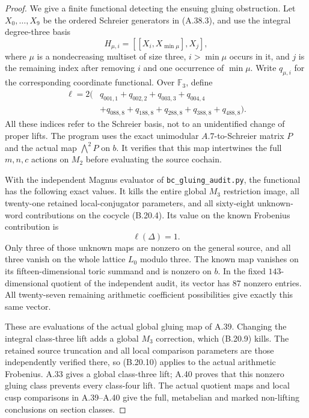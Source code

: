 \begin{proof}
We give a finite functional detecting the ensuing
gluing obstruction. Let $X_0,\ldots,X_9$ be the
ordered Schreier generators in (A.38.3), and use
the integral degree-three basis
\[
 H_{\mu,i}=[[X_i,X_{\min\mu}],X_j],
\]
where $\mu$ is a nondecreasing multiset of size
three, $i>\min\mu$ occurs in it, and $j$ is the
remaining index after removing $i$ and one
occurrence of $\min\mu$. Write $q_{\mu,i}$ for
the corresponding coordinate functional.
Over $\mathbb F_3$, define
\[
 \begin{split}
 \ell=2\bigl(&q_{001,1}+q_{002,2}+q_{003,3}+q_{004,4}\\
             &+q_{088,8}+q_{188,8}+q_{288,8}
                       +q_{388,8}+q_{488,8}\bigr).
 \end{split}                                                \tag{B.20.9}
\]
All these indices refer to the Schreier basis,
not to an unidentified change of proper lifts.
The program uses the exact unimodular
$A.7$-to-Schreier matrix $P$ and the actual
map $\bigwedge^2P$ on $b$. It verifies that this
map intertwines the full $m,n,c$ actions on
$M_2$ before evaluating the source cochain.

With the independent Magnus evaluator of
\texttt{bc\_gluing\_audit.py}, the functional
has the following exact values. It kills the
entire global $M_3$ restriction image, all
twenty-one retained local-conjugator parameters,
and all sixty-eight unknown-word contributions
on the cocycle (B.20.4). Its value on the known
Frobenius contribution is
\[
                           \ell(\Delta)=1.
                                                               \tag{B.20.10}
\]
Only three of those unknown maps are nonzero
on the general source, and all three vanish on
the whole lattice $L_0$ modulo three. The known
map vanishes on its fifteen-dimensional toric
summand and is nonzero on $b$. In the fixed
$143$-dimensional quotient of the independent
audit, its vector has $87$ nonzero entries.
All twenty-seven remaining arithmetic coefficient
possibilities give exactly this same vector.

These are evaluations of the actual global
gluing map of A.39. Changing the integral
class-three lift adds a global $M_3$ correction,
which (B.20.9) kills. The retained source
truncation and all local comparison parameters
are those independently verified there, so
(B.20.10) applies to the actual arithmetic
Frobenius. A.33 gives a global class-three lift;
A.40 proves that this nonzero gluing class
prevents every class-four lift. The actual
quotient maps and local cusp comparisons in
A.39--A.40 give the full, metabelian and marked
non-lifting conclusions on section classes.


\end{proof}
